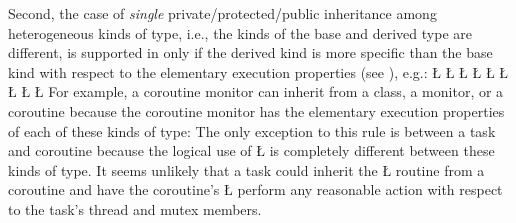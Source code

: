 \documentclass[openright,twoside]{report}
\begin{document}
Second, the case of \emph{single} private/protected/public inheritance among heterogeneous kinds of type, i.e., the kinds of the base and derived type are different, is supported in \uC only if the derived kind is more specific than the base kind with respect to the elementary execution properties (see ), e.g.:
\LGinlinefalse\LGbegin\lgrinde
\L{}
\L{\LB{}}
\L{}
\CE{}\L{}
\CE{}\L{}
\CE{}\L{}
\CE{}\L{}
\CE{}\L{}
\CE{}\L{}
\CE{}\endlgrinde\LGend
For example, a coroutine monitor can inherit from a class, a monitor, or a coroutine because the coroutine monitor has the elementary execution properties of each of these kinds of type:
The only exception to this rule is between a task and coroutine because the logical use of \LGinlinetrue\LGbegin\lgrinde\L{}\endlgrinde\LGend{} is completely different between these kinds of type.
It seems unlikely that a task could inherit the \LGinlinetrue\LGbegin\lgrinde\L{}\endlgrinde\LGend{} routine from a coroutine and have the coroutine's \LGinlinetrue\LGbegin\lgrinde\L{}\endlgrinde\LGend{} perform any reasonable action with respect to the task's thread and mutex members.
\end{document}
